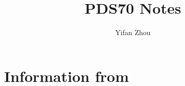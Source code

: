 \documentclass[modern]{aastex62}
\begin{document}
\title{PDS70 Notes}


\author{Yifan Zhou}
\affil{}
\begin{abstract}
  
\end{abstract}
\keywords{}
\section{Information from}


\end{document}

